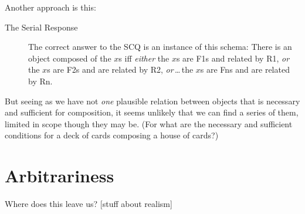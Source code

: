 \documentclass[11pt]{article}
\begin{document}
\begin{spacing}{1.5}
Another approach is this:
\begin{description}
	\item[The Serial Response] The correct answer to the SCQ is an instance of this schema: There is an object composed of the $x$s iff {\em either} the $x$s are F1s and related by R1, {\em or} the $x$s are F2s and are related by R2, {\em or}\,\ldots\,the $x$s are Fns and are related by Rn.~\citep[230]{markosian1998a}
\end{description}
But seeing as we have not {\em one} plausible relation between objects that is necessary and sufficient for composition, it seems unlikely that we can find a series of them, limited in scope though they may be. (For what are the necessary and sufficient conditions for a deck of cards composing a house of cards?)

\section{Arbitrariness}
Where does this leave us? [stuff about realism]

\ifstandalone
\end{spacing}%
\fi
\end{document}
